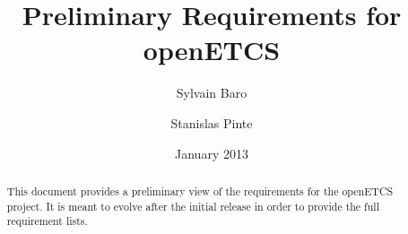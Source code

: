 \documentclass{template/openetcs_article}
\begin{document}
\frontmatter
{}




\title{Preliminary Requirements for openETCS}


\date{January 2013}


\author{Sylvain Baro}
\author{Stanislas Pinte}
  



\begin{abstract}
This document provides a preliminary view of the requirements for the openETCS project. 
It is meant to evolve after the initial release in order to provide the full requirement lists.
\end{abstract}

\maketitle
\tableofcontents
\listoffiguresandtables
\newpage



\newcommand{\tbd}{\colorbox{cyan}{\%\%To Be Defined\%\%}}
\newcommand{\tbc}{\colorbox{cyan}{\%\%To Be Confirmed\%\%}}
\newcommand{\todo}[1]{\colorbox{cyan}{\%\%{#1}\%\%}}
\newlength{\origindent}

\newenvironment{issue}{
	\begin{quote}
	\begin{itshape}Open Issue. 
}{
	\end{itshape}
	\end{quote}
}
\end{document}
